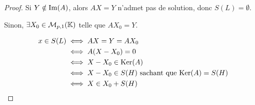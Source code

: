 \documentclass[12pt,a4paper]{report}
\begin{document}
\begin{proof}
    Si $Y \notin \mathrm{Im}(A)$, alors $AX=Y$ n'admet pas de solution, donc $S(L) = \emptyset$.

    Sinon, $\exists X_0 \in \mathcal M_{p,1}(\mathbb{K})$ telle que $AX_0 = Y$.

    \begin{align*}
        x \in S(L) & \iff AX = Y = AX_0 \\
        & \iff A(X - X_0) = 0 \\
        & \iff X - X_0 \in \mathrm{Ker}(A) \\
        & \iff X - X_0 \in S(H) \text{ sachant que } \mathrm{Ker}(A) = S(H) \\
        & \iff X \in X_0 + S(H)
    \end{align*}
\end{proof}


\vspace{1em}
\end{document}

